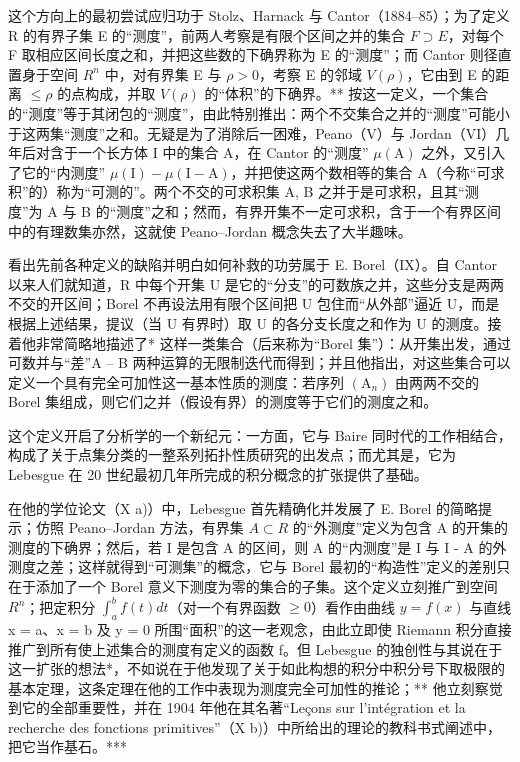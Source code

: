 这个方向上的最初尝试应归功于 Stolz、Harnack 与 Cantor（1884--85）；为了定义 R 的有界子集 E 的“测度”，前两人考察是有限个区间之并的集合 \(F \supset E\)，对每个 F 取相应区间长度之和，并把这些数的下确界称为 E 的“测度”；而 Cantor 则径直置身于空间 \(R^{n}\) 中，对有界集 E 与 \(\rho > 0\)，考察 E 的邻域 \(V(\rho)\)，它由到 E 的距离 \(\leqslant \rho\) 的点构成，并取 \(V(\rho)\) 的“体积”的下确界。** 按这一定义，一个集合的“测度”等于其闭包的“测度”，由此特别推出：两个不交集合之并的“测度”可能小于这两集“测度”之和。无疑是为了消除后一困难，Peano（V）与 Jordan（VI）几年后对含于一个长方体 I 中的集合 A，在 Cantor 的“测度” \(\mu(\mathrm{A})\) 之外，又引入了它的“内测度” \(\mu(\mathrm{I}) - \mu(\mathrm{I} - \mathrm{A})\)，并把使这两个数相等的集合 A（今称“可求积”的）称为“可测的”。两个不交的可求积集 A, B 之并于是可求积，且其“测度”为 A 与 B 的“测度”之和；然而，有界开集不一定可求积，含于一个有界区间中的有理数集亦然，这就使 Peano--Jordan 概念失去了大半趣味。

看出先前各种定义的缺陷并明白如何补救的功劳属于 E. Borel（IX）。自 Cantor 以来人们就知道，R 中每个开集 U 是它的“分支”的可数族之并，这些分支是两两不交的开区间；Borel 不再设法用有限个区间把 U 包住而“从外部”逼近 U，而是根据上述结果，提议（当 U 有界时）取 U 的各分支长度之和作为 U 的测度。接着他非常简略地描述了* 这样一类集合（后来称为“Borel 集”）：从开集出发，通过可数并与“差”A -- B 两种运算的无限制迭代而得到；并且他指出，对这些集合可以定义一个具有完全可加性这一基本性质的测度：若序列 \((\mathrm{A}_{n})\) 由两两不交的 Borel 集组成，则它们之并（假设有界）的测度等于它们的测度之和。

这个定义开启了分析学的一个新纪元：一方面，它与 Baire 同时代的工作相结合，构成了关于点集分类的一整系列拓扑性质研究的出发点；而尤其是，它为 Lebesgue 在 20 世纪最初几年所完成的积分概念的扩张提供了基础。

在他的学位论文（X a)）中，Lebesgue 首先精确化并发展了 E. Borel 的简略提示；仿照 Peano--Jordan 方法，有界集 \(A \subset R\) 的“外测度”定义为包含 A 的开集的测度的下确界；然后，若 I 是包含 A 的区间，则 A 的“内测度”是 I 与 I - A 的外测度之差；这样就得到“可测集”的概念，它与 Borel 最初的“构造性”定义的差别只在于添加了一个 Borel 意义下测度为零的集合的子集。这个定义立刻推广到空间 \(R^{n}\)；把定积分 \(\int_{a}^{b} f(t) dt\)（对一个有界函数 \(\geqslant 0\)）看作由曲线 \(y = f(x)\) 与直线 x = a、x = b 及 y = 0 所围“面积”的这一老观念，由此立即使 Riemann 积分直接推广到所有使上述集合的测度有定义的函数 f。但 Lebesgue 的独创性与其说在于这一扩张的想法*，不如说在于他发现了关于如此构想的积分中积分号下取极限的基本定理，这条定理在他的工作中表现为测度完全可加性的推论；** 他立刻察觉到它的全部重要性，并在 1904 年他在其名著“Leçons sur l'intégration et la recherche des fonctions primitives”（X b)）中所给出的理论的教科书式阐述中，把它当作基石。***

